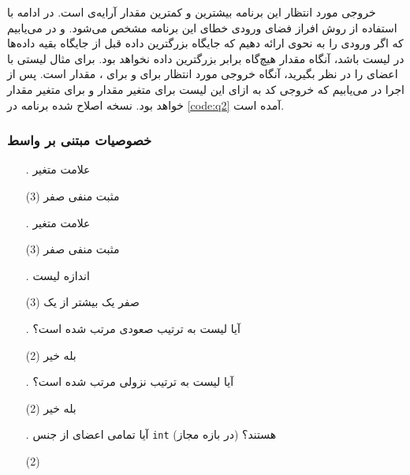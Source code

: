 \documentclass[twoside]{article}
\newenvironment{answer}{}{\medskip}
\begin{document}
\begin{answer}
خروجی مورد انتظار این برنامه بیشترین و کمترین مقدار آرایه‌ی  است.
در ادامه با استفاده از روش افراز فضای ورودی خطای این برنامه مشخص می‌شود. و در می‌یابیم که اگر ورودی را به نحوی ارائه دهیم که جایگاه بزرگترین داده قبل از جایگاه بقیه داده‌ها در لیست باشد، آنگاه مقدار  هیچ‌گاه برابر بزرگترین داده نخواهد بود.
برای مثال لیستی با اعضای \code{\lr{[4, 3, 2, 1]}}
را در نظر بگیرید، آنگاه خروجی مورد انتظار برای   و برای ، مقدار  است. پس از اجرا در می‌یابیم که خروجی
 کد به ازای این لیست برای متغیر  مقدار  و برای متغیر  مقدار  خواهد بود. 
 نسخه اصلاح شده برنامه در \autoref{code:q2} آمده است. 

\subsubsection*{خصوصیات مبتنی بر واسط}
\begin{enumerate}
	\item[\lr{\textbf{A}}.]
علامت متغیر 
	\begin{tasks}(3)
		\task[\lr{1}. ] مثبت
		\task[\lr{2}. ] منفی
		\task[\lr{3}. ] صفر
	\end{tasks}
	\item[\lr{\textbf{B}}.]
علامت متغیر 
	\begin{tasks}(3)
		\task[\lr{1}. ] مثبت
		\task[\lr{2}. ] منفی
		\task[\lr{3}. ] صفر
	\end{tasks}
	\item[\lr{\textbf{C}}.]
اندازه لیست 
	\begin{tasks}(3)
		\task[\lr{1}. ] صفر
		\task[\lr{2}. ] یک 
		\task[\lr{3}. ] بیشتر از یک
	\end{tasks}
	\item[\lr{\textbf{D}}.]
آیا لیست  به ترتیب صعودی مرتب شده است؟
	\begin{tasks}(2)
		\task[\lr{1}. ] بله
		\task[\lr{2}. ] خیر 
	\end{tasks}
	\item[\lr{\textbf{E}}.]
آیا لیست  به ترتیب نزولی مرتب شده است؟
	\begin{tasks}(2)
		\task[\lr{1}. ] بله
		\task[\lr{2}. ] خیر 
	\end{tasks}
	\item[\lr{\textbf{F}}.]
آیا تمامی اعضای  از جنس  \texttt{int} (در بازه مجاز) هستند؟
	\begin{tasks}(2)

\end{tasks}
\end{enumerate}
\end{answer}
\end{document}
